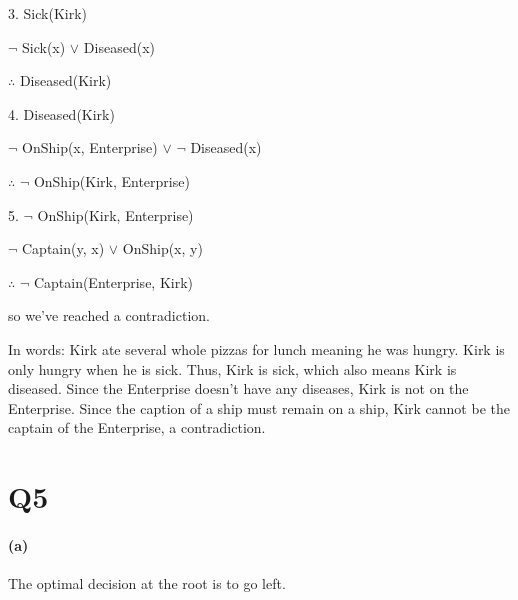 \documentclass[11pt,a4paper]{article}
\begin{document}
3. Sick(Kirk)

$\neg$ Sick(x) $\vee$ Diseased(x)

$\therefore$ Diseased(Kirk)
\newline

4. Diseased(Kirk)

$\neg$ OnShip(x, Enterprise) $\vee$ $\neg$ Diseased(x)

$\therefore$ $\neg$ OnShip(Kirk, Enterprise)
\newline

5. $\neg$ OnShip(Kirk, Enterprise)

$\neg$ Captain(y, x) $\vee$ OnShip(x, y) 

$\therefore$ $\neg$ Captain(Enterprise, Kirk)

so we've reached a contradiction.

In words: Kirk ate several whole pizzas for lunch meaning he was hungry. Kirk is only hungry when he is sick. Thus, Kirk is sick, which also means Kirk is diseased. Since the Enterprise doesn't have any diseases, Kirk is not on the Enterprise. Since the caption of a ship must remain on a ship, Kirk cannot be the captain of the Enterprise, a contradiction.

\section*{Q5}

\paragraph*{(a)}

\begin{center}
\end{center}

The optimal decision at the root is to go left.
\end{document}
